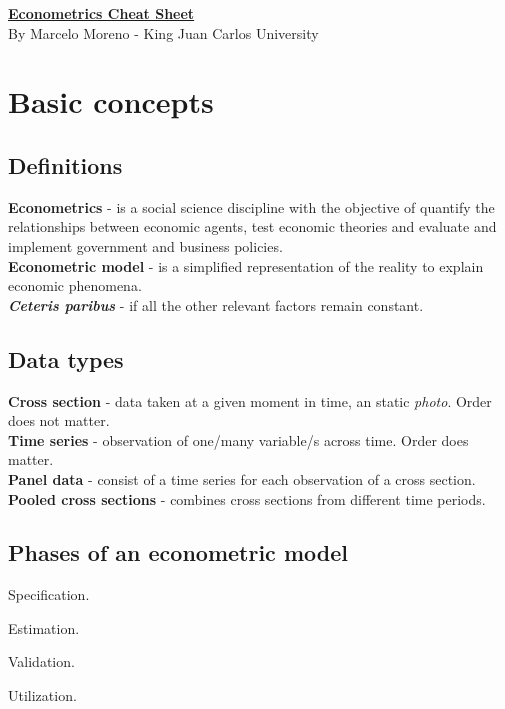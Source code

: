 \documentclass[10pt, a4paper, landscape]{extarticle}
\begin{document}
\setlength{\footskip}{12pt}

\begin{multicols}{3} %
\begin{center}
	\textbf{\LARGE \href{https://github.com/marcelomijas/econometrics-cheatsheet}{Econometrics Cheat Sheet}} \\
	{\footnotesize By Marcelo Moreno - King Juan Carlos University}
\end{center}
\section*{Basic concepts}
	\subsection*{Definitions}
		\textbf{Econometrics} - is a social science discipline with the objective of quantify the relationships between economic agents, test economic theories and evaluate and implement government and business policies. \\
		\textbf{Econometric model} - is a simplified representation of the reality to explain economic phenomena. \\
		\textbf{\textsl{Ceteris paribus}} - if all the other relevant factors remain constant.
	\subsection*{Data types}
		\textbf{Cross section} - data taken at a given moment in time, an static \textsl{photo}. Order does not matter. \\
		\textbf{Time series} - observation of one/many variable/s across time. Order does matter. \\
		\textbf{Panel data} - consist of a time series for each observation of a cross section. \\
		\textbf{Pooled cross sections} - combines cross sections from different time periods.
	\subsection*{Phases of an econometric model}
		\begin{enumerate}[leftmargin=*]
			\setlength{\multicolsep}{0pt}
		\end{enumerate}

\end{multicols}
\end{document}
